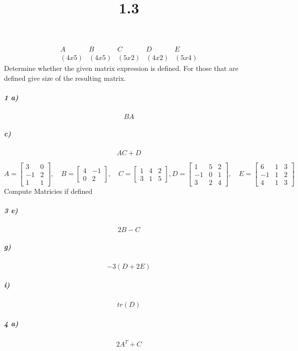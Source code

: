\documentclass[fleqn]{article}
\title{1.3}
\begin{document}
\maketitle
\pagebreak
 \[\begin{matrix}A & B & C & D & E \\ (4x5) & (4x5) & (5x2) & (4x2) & (5x4)\end{matrix}\]Determine whether the given matrix expression is defined. For those that are defined  give size of the resulting matrix.

\subparagraph{1 a)}

\[
BA
\]
\vfill



\subparagraph{c)}

\[
 AC + D
\]
\vfill


\pagebreak
\[A = \begin{bmatrix} 3 & 0 \\ -1 & 2 \\ 1 & 1 \end{bmatrix}, \quad B = \begin{bmatrix} 4 & -1 \\ 0 & 2 \end{bmatrix}, \quad C = \begin{bmatrix} 1 & 4 & 2 \\ 3 & 1 & 5 \end{bmatrix},D = \begin{bmatrix} 1 & 5 & 2 \\ -1 & 0 & 1 \\ 3 & 2 & 4 \end{bmatrix}, \quad E = \begin{bmatrix} 6 & 1 & 3 \\ -1 & 1 & 2 \\ 4 & 1 & 3 \end{bmatrix}\]
Compute Matricies if defined

\subparagraph{3 e)}

\[
2B - C
\]
\vfill



\subparagraph{g)}

\[
-3(D + 2E)
\]
\vfill


\pagebreak


\subparagraph{i)}

\[
tr(D)
\]
\vfill



\subparagraph{4 a)}

\[
2A^T + C
\]
\vfill


\pagebreak
\end{document}
